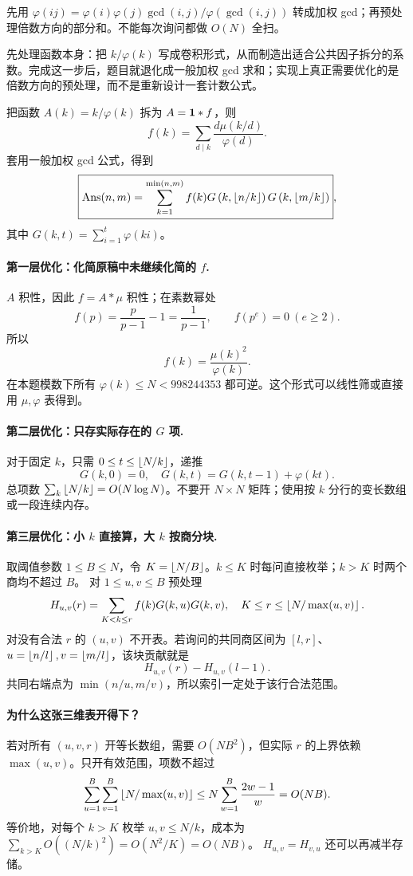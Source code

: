 \hint 先用 $\varphi(ij)=\varphi(i)\varphi(j)\gcd(i,j)/\varphi(\gcd(i,j))$ 转成加权 gcd；再预处理倍数方向的部分和。不能每次询问都做 $O(N)$ 全扫。

\begin{pitfall}[讲解：先看这题到底在做什么]
先处理函数本身：把 $k/\varphi(k)$ 写成卷积形式，从而制造出适合公共因子拆分的系数。完成这一步后，题目就退化成一般加权 gcd 求和；实现上真正需要优化的是倍数方向的预处理，而不是重新设计一套计数公式。
\end{pitfall}

\sol 把函数 $A(k)=k/\varphi(k)$ 拆为 $A=\mathbf 1*f$，则
\[
 f(k)=\sum_{d\mid k}\frac{d\mu(k/d)}{\varphi(d)}.
\]
套用一般加权 gcd 公式，得到
\[
\boxed{\mathrm{Ans}(n,m)=\sum_{k=1}^{\min(n,m)}f(k)
G\left(k,\left\lfloor n/k\right\rfloor\right)G\left(k,\left\lfloor m/k\right\rfloor\right)},
\]
其中 $G(k,t)=\sum_{i=1}^t\varphi(ki)$。

\paragraph{第一层优化：化简原稿中未继续化简的 $f$.}
$A$ 积性，因此 $f=A*\mu$ 积性；在素数幂处
\[
 f(p)=\frac p{p-1}-1=\frac1{p-1},\qquad
 f(p^e)=0\ (e\ge2).
\]
所以
\[
 f(k)=\frac{\mu(k)^2}{\varphi(k)}.
\]
在本题模数下所有 $\varphi(k)\le N<998244353$ 都可逆。这个形式可以线性筛或直接用 $\mu,\varphi$ 表得到。

\paragraph{第二层优化：只存实际存在的 $G$ 项.}
对于固定 $k$，只需 $0\le t\le\left\lfloor N/k\right\rfloor$，递推
\[
 G(k,0)=0,\quad G(k,t)=G(k,t-1)+\varphi(kt).
\]
总项数 $\sum_k\left\lfloor N/k\right\rfloor=O(N\log N)$。不要开 $N\times N$ 矩阵；使用按 $k$ 分行的变长数组或一段连续内存。

\paragraph{第三层优化：小 $k$ 直接算，大 $k$ 按商分块.}
取阈值参数 $1\le B\le N$，令 $K=\left\lfloor N/B\right\rfloor$。$k\le K$ 时每问直接枚举；$k>K$ 时两个商均不超过 $B$。
对 $1\le u,v\le B$ 预处理
\[
 H_{u,v}(r)=\sum_{K<k\le r}f(k)G(k,u)G(k,v),
 \quad K\le r\le\left\lfloor N/\max(u,v)\right\rfloor.
\]
对没有合法 $r$ 的 $(u,v)$ 不开表。若询问的共同商区间为 $[l,r]$、$u=\left\lfloor n/l\right\rfloor,v=\left\lfloor m/l\right\rfloor$，该块贡献就是
\[
 H_{u,v}(r)-H_{u,v}(l-1).
\]
共同右端点为 $\min(n/u,m/v)$，所以索引一定处于该行合法范围。

\paragraph{为什么这张三维表开得下？}
若对所有 $(u,v,r)$ 开等长数组，需要 $O(NB^2)$，但实际 $r$ 的上界依赖 $\max(u,v)$。只开有效范围，项数不超过
\[
\sum_{u=1}^B\sum_{v=1}^B\left\lfloor N/\max(u,v)\right\rfloor
\le N\sum_{w=1}^B\frac{2w-1}{w}=O(NB).
\]
等价地，对每个 $k>K$ 枚举 $u,v\le N/k$，成本为
$\sum_{k>K}O((N/k)^2)=O(N^2/K)=O(NB)$。
$H_{u,v}=H_{v,u}$ 还可以再减半存储。

